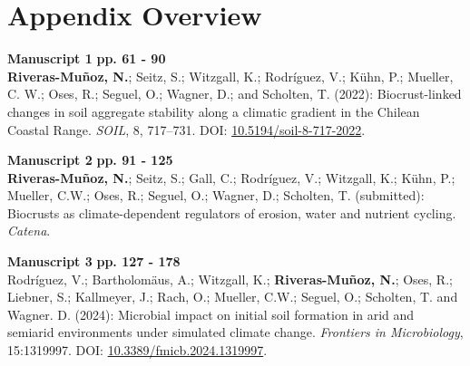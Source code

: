 

\chapter*{Appendix Overview}
\label{chap:appendix_overview} %


\vspace{\baselineskip}


\noindent %
\textbf{Manuscript 1} \hfill \textbf{pp. 61 - 90} \\ %
\textbf{Riveras-Muñoz, N.}; Seitz, S.; Witzgall, K.; Rodríguez, V.; Kühn, P.; Mueller, C. W.; Oses, R.; Seguel, O.; Wagner, D.; and Scholten, T. (2022): Biocrust-linked changes in soil aggregate stability along a climatic gradient in the Chilean Coastal Range. \textit{SOIL}, 8, 717--731. DOI: \href{https://doi.org/10.5194/soil-8-717-2022}{10.5194/soil-8-717-2022}.

\vspace{\baselineskip} %

\noindent
\textbf{Manuscript 2} \hfill \textbf{pp. 91 - 125} \\ %
\textbf{Riveras-Muñoz, N.}; Seitz, S.; Gall, C.; Rodríguez, V.; Witzgall, K.; Kühn, P.; Mueller, C.W.; Oses, R.; Seguel, O.; Wagner, D.; Scholten, T. (submitted): Biocrusts as climate-dependent regulators of erosion, water and nutrient cycling. \textit{Catena}.

\vspace{\baselineskip}

\noindent
\textbf{Manuscript 3} \hfill \textbf{pp. 127 - 178} \\ %
Rodríguez, V.; Bartholomäus, A.; Witzgall, K.; \textbf{Riveras-Muñoz, N.}; Oses, R.; Liebner, S.; Kallmeyer, J.; Rach, O.; Mueller, C.W.; Seguel, O.; Scholten, T. and Wagner. D. (2024): Microbial impact on initial soil formation in arid and semiarid environments under simulated climate change. \textit{Frontiers in Microbiology}, 15:1319997. DOI: \href{https://doi.org/10.3389/fmicb.2024.1319997}{10.3389/fmicb.2024.1319997}.

